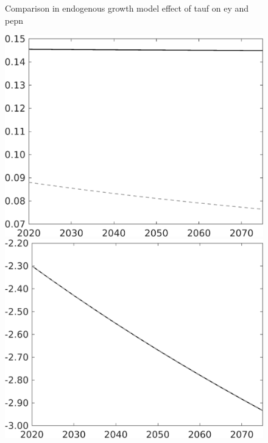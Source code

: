 \documentclass[12pt]{article}
\begin{document}
\begin{figure}{Comparison in endogenous growth model effect of tauf on ey and pepn }
\begin{minipage}[]{0.32\textwidth}
	\end{minipage}\begin{minipage}[]{0.32\textwidth}
		\includegraphics[width=1\textwidth]{../../codding_model/own_basedOnFried/optimalPol_010922_revision/figures/all_13Sept22/LevTaufNoTauf_TaulCalib_regime0_pepn_spillover0_nsk0_xgr0_knspil1_sep0_LFlimit0_emsbase0_countec0_GovRev0_etaa0.79_lgd0.png}
	\end{minipage}
	\begin{minipage}[]{0.32\textwidth}
		\includegraphics[width=1\textwidth]{../../codding_model/own_basedOnFried/optimalPol_010922_revision/figures/all_13Sept22/PerdifNoTauf_regime0_CompTaul_EY_spillover0_nsk0_xgr0_knspil1_sep0_LFlimit0_emsbase0_countec0_GovRev0_etaa0.79_lgd0.png}

\end{minipage}
\end{figure}
\end{document}
